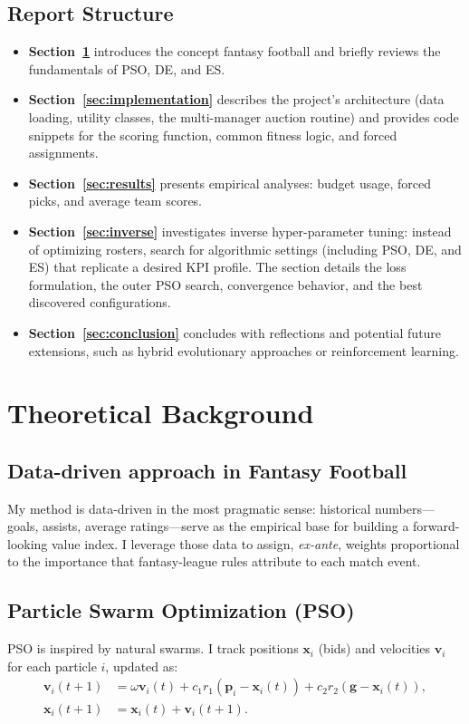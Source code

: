 \documentclass[sigconf]{acmart}
\begin{document}
	\subsection{Report Structure}
	\begin{itemize}
		\item \textbf{Section~\ref{sec:theory}} introduces the concept fantasy football and briefly reviews the fundamentals of PSO, DE, and ES.
		\item \textbf{Section~\ref{sec:implementation}} describes the project’s architecture (data loading, utility classes, the multi-manager auction routine) and provides code snippets for the scoring function, common fitness logic, and forced assignments.
		\item \textbf{Section~\ref{sec:results}} presents empirical analyses: budget usage, forced picks, and average team scores.
		\item \textbf{Section~\ref{sec:inverse}} investigates inverse hyper-parameter tuning: instead of optimizing rosters, search for algorithmic settings (including PSO, DE, and ES) that replicate a desired KPI profile. The section details the loss formulation, the outer PSO search, convergence behavior, and the best discovered configurations.
		\item \textbf{Section~\ref{sec:conclusion}} concludes with reflections and potential future extensions, such as hybrid evolutionary approaches or reinforcement learning.
	\end{itemize}
	
	\section{Theoretical Background}
	\label{sec:theory}
	
\subsection{Data-driven approach in Fantasy Football}
My method is data-driven in the most pragmatic sense: historical
numbers—goals, assists, average ratings—serve as the empirical base
for building a forward-looking value index. I leverage those data
to assign, \emph{ex-ante}, weights proportional to the importance that
 fantasy-league rules attribute to each match event.

	
	\subsection{Particle Swarm Optimization (PSO)}
	PSO is inspired by natural swarms. I track positions $\mathbf{x}_i$ (bids) and velocities $\mathbf{v}_i$ for each particle $i$, updated as:
	\begin{align*}
		\mathbf{v}_i(t+1) &= \omega \mathbf{v}_i(t)
		+ c_1 r_1 (\mathbf{p}_i - \mathbf{x}_i(t))
		+ c_2 r_2 (\mathbf{g} - \mathbf{x}_i(t)), \\
		\mathbf{x}_i(t+1) &= \mathbf{x}_i(t) + \mathbf{v}_i(t+1).
	\end{align*}
	
\end{document}
